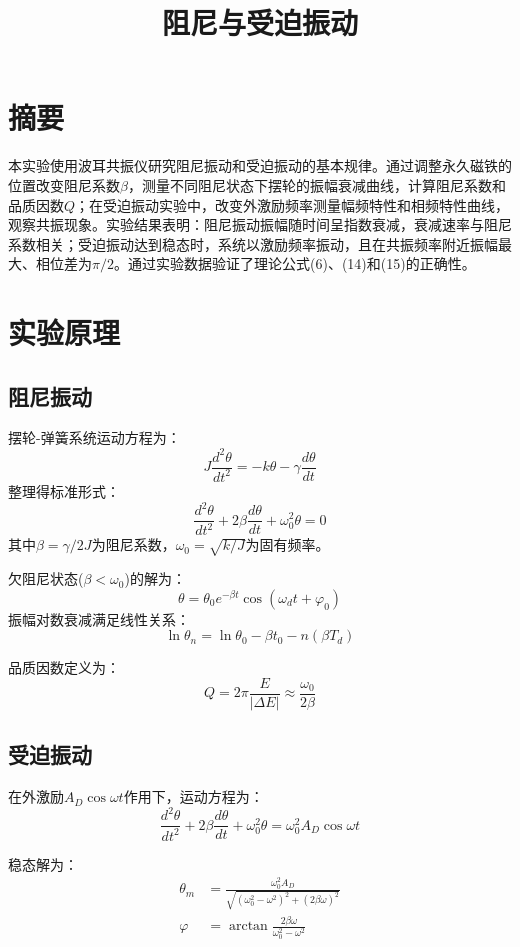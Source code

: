 \documentclass[UTF8]{ctexart}
\title{阻尼与受迫振动}
\author{}
\date{}
\begin{document}
\maketitle

\section{摘要}
本实验使用波耳共振仪研究阻尼振动和受迫振动的基本规律。通过调整永久磁铁的位置改变阻尼系数$\beta$，测量不同阻尼状态下摆轮的振幅衰减曲线，计算阻尼系数和品质因数$Q$；在受迫振动实验中，改变外激励频率测量幅频特性和相频特性曲线，观察共振现象。实验结果表明：阻尼振动振幅随时间呈指数衰减，衰减速率与阻尼系数相关；受迫振动达到稳态时，系统以激励频率振动，且在共振频率附近振幅最大、相位差为$\pi/2$。通过实验数据验证了理论公式(6)、(14)和(15)的正确性。

\section{实验原理}
\subsection{阻尼振动}
摆轮-弹簧系统运动方程为：
\[ J\frac{d^2\theta}{dt^2} = -k\theta - \gamma\frac{d\theta}{dt} \]
整理得标准形式：
\[ \frac{d^2\theta}{dt^2} + 2\beta\frac{d\theta}{dt} + \omega_0^2\theta = 0 \]
其中$\beta=\gamma/2J$为阻尼系数，$\omega_0=\sqrt{k/J}$为固有频率。

欠阻尼状态($\beta<\omega_0$)的解为：
\[ \theta = \theta_0 e^{-\beta t}\cos(\omega_d t + \varphi_0) \]
振幅对数衰减满足线性关系：
\[ \ln\theta_n = \ln\theta_0 - \beta t_0 - n(\beta T_d) \]

品质因数定义为：
\[ Q = 2\pi\frac{E}{|\Delta E|} \approx \frac{\omega_0}{2\beta} \]

\subsection{受迫振动}
在外激励$A_D\cos\omega t$作用下，运动方程为：
\[ \frac{d^2\theta}{dt^2} + 2\beta\frac{d\theta}{dt} + \omega_0^2\theta = \omega_0^2 A_D\cos\omega t \]

稳态解为：
\begin{align*}
\theta_m &= \frac{\omega_0^2 A_D}{\sqrt{(\omega_0^2-\omega^2)^2 + (2\beta\omega)^2}} \\
\varphi &= \arctan\frac{2\beta\omega}{\omega_0^2-\omega^2}
\end{align*}
\end{document}
